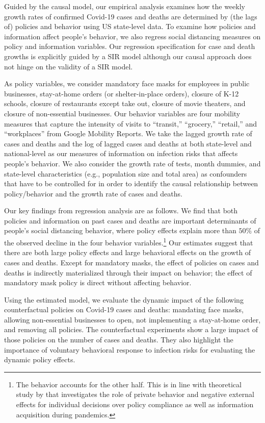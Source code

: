 \documentclass[11pt,reqno,letter]{amsart}
\theoremstyle{definition}
\begin{document}
Guided by the causal model, our empirical analysis examines how the weekly growth rates of confirmed Covid-19 cases and deaths are determined by (the lags of) policies and behavior using US state-level data. To examine how policies and information affect people's behavior, we also regress social distancing measures  on policy and information variables. Our regression specification for case and death growths is explicitly guided by a SIR model although  our causal approach does not hinge on the validity of a SIR model.


As policy variables, we consider  mandatory face masks for employees in public businesses, stay-at-home orders (or shelter-in-place orders), closure of K-12 schools, closure of restaurants except take out, closure of movie theaters, and closure of non-essential businesses. Our behavior variables are four mobility measures that capture the intensity of visits to ``transit,'' ``grocery,'' ``retail,'' and ``workplaces''  from Google Mobility Reports. We take the lagged growth rate of cases and deaths and the log of lagged cases and deaths at both state-level and national-level as our measures of information on infection risks that affects people's  behavior. We also consider the growth rate of tests, month dummies, and state-level characteristics (e.g., population size and total area) as confounders that have to be controlled for in order to identify the causal relationship between policy/behavior and the growth rate of cases and deaths.

Our key findings from regression analysis are as follows.  We find
that both policies and information on past cases and deaths are important
determinants of people's social distancing behavior, where policy
effects explain more than $50\%$ of the observed decline in the four
behavior variables.\footnote{The behavior accounts for the other half. This is in line with theoretical study by \cite{gitmez2020} that investigates the role of private behavior and
negative external effects for individual decisions over policy compliance as well as information acquisition during pandemics.} Our estimates suggest that there are both large policy effects and large behavioral effects on the growth of cases and deaths. Except for mandatory masks, the effect of policies on cases and deaths is indirectly materialized through their impact on behavior; the effect of mandatory mask policy is direct without affecting behavior.


Using the estimated model, we evaluate the dynamic impact of the following counterfactual policies on Covid-19 cases and deaths: mandating face masks, allowing non-essential businesses to open, not implementing a stay-at-home order, and removing all policies.  The counterfactual experiments show a large impact of  those policies on  the number of cases and deaths.  They also highlight the importance of voluntary behavioral response to infection risks for evaluating the dynamic policy effects.
\end{document}
